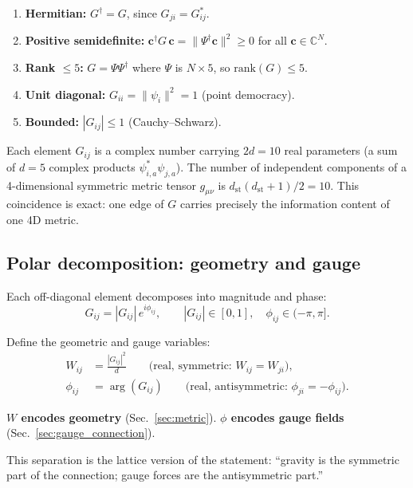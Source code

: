 \documentclass[12pt]{article}
\theoremstyle{remark}
\theoremstyle{definition}
\newcommand{\CC}{\mathbb{C}}
\begin{document}
\begin{enumerate}[label=(\alph*)]
\item \textbf{Hermitian:} $G^\dagger = G$, since $G_{ji} = G^*_{ij}$.
\item \textbf{Positive semidefinite:} $\mathbf{c}^\dagger G\,\mathbf{c} = \|\Psi^\dagger\mathbf{c}\|^2 \geq 0$ for all $\mathbf{c} \in \CC^N$.
\item \textbf{Rank $\leq 5$:} $G = \Psi\Psi^\dagger$ where $\Psi$ is $N \times 5$, so $\text{rank}(G) \leq 5$.
\item \textbf{Unit diagonal:} $G_{ii} = \|\psi_i\|^2 = 1$ (point democracy).
\item \textbf{Bounded:} $|G_{ij}| \leq 1$ (Cauchy--Schwarz).
\end{enumerate}

Each element $G_{ij}$ is a complex number carrying $2d = 10$ real parameters (a sum of $d = 5$ complex products $\psi^*_{i,a}\psi_{j,a}$). The number of independent components of a 4-dimensional symmetric metric tensor $g_{\mu\nu}$ is $d_\text{st}(d_\text{st}+1)/2 = 10$. This coincidence is exact: one edge of $G$ carries precisely the information content of one 4D metric.

\subsection{Polar decomposition: geometry and gauge}

Each off-diagonal element decomposes into magnitude and phase:
\begin{equation}
G_{ij} = |G_{ij}|\,e^{i\phi_{ij}}, \qquad |G_{ij}| \in [0, 1], \quad \phi_{ij} \in (-\pi, \pi].
\end{equation}

Define the geometric and gauge variables:
\begin{align}
W_{ij} &= \frac{|G_{ij}|^2}{d} \qquad\text{(real, symmetric: } W_{ij} = W_{ji}\text{)}, \label{eq:W}\\
\phi_{ij} &= \arg(G_{ij}) \qquad\text{(real, antisymmetric: } \phi_{ji} = -\phi_{ij}\text{)}. \label{eq:phi}
\end{align}

\textbf{$W$ encodes geometry} (Sec.~\ref{sec:metric}). \textbf{$\phi$ encodes gauge fields} (Sec.~\ref{sec:gauge_connection}).

This separation is the lattice version of the statement: ``gravity is the symmetric part of the connection; gauge forces are the antisymmetric part.''
\end{document}
